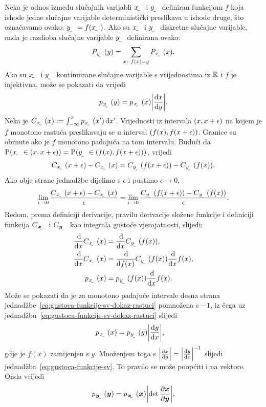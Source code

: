\documentclass[oneside]{book}
\begin{document}
Neka je odnos između slučajnih varijabli $\rvar x$ i $\rvar y$ definiran funkcijom $f$ koja ishode jedne slučajne varijable deterministički preslikava u ishode druge, što označavamo ovako: $\rvar y = f(\rvar x)$.  Ako su $\rvar x$ i $\rvar y$ diskretne slučajne varijable, onda je razdioba slučajne varijable $\rvar y$ definirana ovako:
\begin{align}
	P_{\rvar y}(y) = \sum_{x\colon f(x)=y} P_\rvar{x}(x) \text{.}
\end{align} 
Ako su $\rvar x$ i $\rvar y$ kontinuirane slučajne varijable s vrijednostima iz $\mathbb{R}$ i $f$ je injektivna, može se pokazati \citep{Elezovic:2007:VSSV} da vrijedi
\begin{align} \label{eq:gustoca-funkcije-sv}
p_{\rvar y}(y) = p_\rvar{x}(x) \envert{\od{x}{y}} \text{.}
\end{align} 
Neka je $C_{\rvar x}(x) := \int_{-\infty}^{x} p_{\rvar x}(x') \dif{x'}$. Vrijednosti iz intervala $\intoo{x, x+\epsilon}$ na kojem je $f$ monotono rastuća preslikavaju se u interval $\intoo{f(x), f(x+\epsilon)}$. Granice su obrnute ako je $f$ monotono padajuća na tom intervalu. Budući da $\P\del{\rvar x\in\intoo{x, x+\epsilon}}=\P\del{\rvar y\in\intoo{f(x), f(x+\epsilon)}}$, vrijedi
\begin{align}
C_{\rvar x}(x+\epsilon)-C_{\rvar x}(x) = 
C_{\rvar y}(f(x+\epsilon))-C_{\rvar y}(f(x)) \text{.}
\end{align}
Ako obje strane jednadžbe dijelimo s $\epsilon$ i pustimo $\epsilon\to0$, 
\begin{align}
	\lim_{\epsilon\to 0}\frac{C_{\rvar x}(x+\epsilon)-C_{\rvar x}(x)}{\epsilon} = \lim_{\epsilon\to 0}\frac{C_{\rvar y}(f(x+\epsilon))-C_{\rvar y}(f(x))}{\epsilon} \text{.}
\end{align}
Redom, prema definiciji derivacije, pravilu derivacije složene funkcije i definiciji funkcija $C_\rvec{x}$ i $C_\rvec{y}$ kao integrala gustoće vjerojatnosti, slijedi:
\begin{align}
\od{}{x}C_{\rvar x}(x) &= \od{}{x}C_{\rvar y}(f(x)) \text{,}\\
\od{}{x}C_{\rvar x}(x) &= \od{}{f(x)}C_{\rvar y}(f(x))\od{}{x}f(x) \text{,}\\
p_{\rvar x}(x) &= p_{\rvar y}(f(x))\od{}{x}f(x) \text{.} \label{eq:gustoca-funkcije-sv-dokaz-rastuci}
\end{align}
Može se pokazati da je za monotono padajuće intervale desna strana jednadžbe~\eqref{eq:gustoca-funkcije-sv-dokaz-rastuci} pomnožena s $-1$, iz čega uz jednadžbu~\eqref{eq:gustoca-funkcije-sv-dokaz-rastuci} slijedi
\begin{align}
p_{\rvar x}(x) &= p_{\rvar y}(y)\envert{\od{y}{x}} \text{,} \label{eq:gustoca-funkcije-sv-dokaz-xy}
\end{align}
gdje je $f(x)$ zamijenjen s $y$. Množenjem toga s $\envert{\od{x}{y}}=\envert{\od{y}{x}}^{-1}$ slijedi jednadžba~\eqref{eq:gustoca-funkcije-sv}. To pravilo se može poopćiti i na vektore. Onda vrijedi \citep{Murphy:2012:MLPP}
\begin{align}
p_{\rvec y}(\vec y)=p_\rvec{x}(\vec x)\envert{\det\pd{\vec x}{\vec y}} \text{.}
\end{align}
\end{document}
